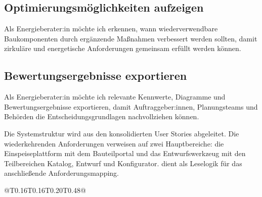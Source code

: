 \subsection{Optimierungsmöglichkeiten aufzeigen}
\label{us:e-06} Als Energieberater:in möchte ich erkennen, wann wiederverwendbare Baukomponenten durch ergänzende Maßnahmen verbessert werden sollten, damit zirkuläre und energetische Anforderungen gemeinsam erfüllt werden können.

\subsection{Bewertungsergebnisse exportieren}
\label{us:e-07} Als Energieberater:in möchte ich relevante Kennwerte, Diagramme und Bewertungsergebnisse exportieren, damit Auftraggeber:innen, Planungsteams und Behörden die Entscheidungsgrundlagen nachvollziehen können.


Die Systemstruktur wird aus den konsolidierten User Stories abgeleitet. Die wiederkehrenden Anforderungen verweisen auf zwei Hauptbereiche: die Einspeiseplattform mit dem Bauteilportal und das Entwurfswerkzeug mit den Teilbereichen Katalog, Entwurf und Konfigurator.  dient als Leselogik für das anschließende Anforderungsmapping.

\begin{Table}[title=Systemarchitektur, key=tab:systemarchitektur]
\begin{SemioTable}{@{}T{0.16\tabcolsep}T{0.16\tabcolsep}T{0.20\tabcolsep}T{0.48\tabcolsep}@{}}
\end{SemioTable}
\end{Table}

